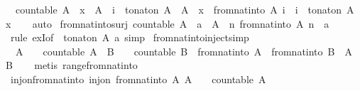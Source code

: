 \begin{isabellebody}
\ \ {\isachardoublequoteopen}countable\ A\ {\isasymLongrightarrow}\ x\ {\isasymin}\ A\ {\isasymLongrightarrow}\ i\ {\isasymin}\ to{\isacharunderscore}nat{\isacharunderscore}on\ A\ {\isacharbackquote}\ A\ {\isasymLongrightarrow}\ x\ {\isacharequal}\ from{\isacharunderscore}nat{\isacharunderscore}into\ A\ i\ {\isasymlongleftrightarrow}\ i\ {\isacharequal}\ to{\isacharunderscore}nat{\isacharunderscore}on\ A\ x{\isachardoublequoteclose}\isanewline
%
\isadelimproof
\ \ %
\endisadelimproof
%
\isatagproof
{}\isamarkupfalse%
\ auto%
\endisatagproof
{\isafoldproof}%
%
\isadelimproof
\isanewline
%
\endisadelimproof
\isanewline
{}\isamarkupfalse%
\ from{\isacharunderscore}nat{\isacharunderscore}into{\isacharunderscore}surj{\isacharcolon}\ {\isachardoublequoteopen}countable\ A\ {\isasymLongrightarrow}\ a\ {\isasymin}\ A\ {\isasymLongrightarrow}\ {\isasymexists}n{\isachardot}\ from{\isacharunderscore}nat{\isacharunderscore}into\ A\ n\ {\isacharequal}\ a{\isachardoublequoteclose}\isanewline
%
\isadelimproof
\ \ %
\endisadelimproof
%
\isatagproof
{}\isamarkupfalse%
\ {\isacharparenleft}rule\ exI{\isacharbrackleft}of\ {\isacharunderscore}\ {\isachardoublequoteopen}to{\isacharunderscore}nat{\isacharunderscore}on\ A\ a{\isachardoublequoteclose}{\isacharbrackright}{\isacharparenright}\ simp%
\endisatagproof
{\isafoldproof}%
%
\isadelimproof
\isanewline
%
\endisadelimproof
\isanewline
{}\isamarkupfalse%
\ from{\isacharunderscore}nat{\isacharunderscore}into{\isacharunderscore}inject{\isacharbrackleft}simp{\isacharbrackright}{\isacharcolon}\isanewline
\ \ {\isachardoublequoteopen}A\ {\isasymnoteq}\ {\isacharbraceleft}{\isacharbraceright}\ {\isasymLongrightarrow}\ countable\ A\ {\isasymLongrightarrow}\ B\ {\isasymnoteq}\ {\isacharbraceleft}{\isacharbraceright}\ {\isasymLongrightarrow}\ countable\ B\ {\isasymLongrightarrow}\ from{\isacharunderscore}nat{\isacharunderscore}into\ A\ {\isacharequal}\ from{\isacharunderscore}nat{\isacharunderscore}into\ B\ {\isasymlongleftrightarrow}\ A\ {\isacharequal}\ B{\isachardoublequoteclose}\isanewline
%
\isadelimproof
\ \ %
\endisadelimproof
%
\isatagproof
{}\isamarkupfalse%
\ {\isacharparenleft}metis\ range{\isacharunderscore}from{\isacharunderscore}nat{\isacharunderscore}into{\isacharparenright}%
\endisatagproof
{\isafoldproof}%
%
\isadelimproof
\isanewline
%
\endisadelimproof
\isanewline
{}\isamarkupfalse%
\ inj{\isacharunderscore}on{\isacharunderscore}from{\isacharunderscore}nat{\isacharunderscore}into{\isacharcolon}\ {\isachardoublequoteopen}inj{\isacharunderscore}on\ from{\isacharunderscore}nat{\isacharunderscore}into\ {\isacharparenleft}{\isacharbraceleft}A{\isachardot}\ A\ {\isasymnoteq}\ {\isacharbraceleft}{\isacharbraceright}\ {\isasymand}\ countable\ A{\isacharbraceright}{\isacharparenright}{\isachardoublequoteclose}\isanewline

\end{isabellebody}
